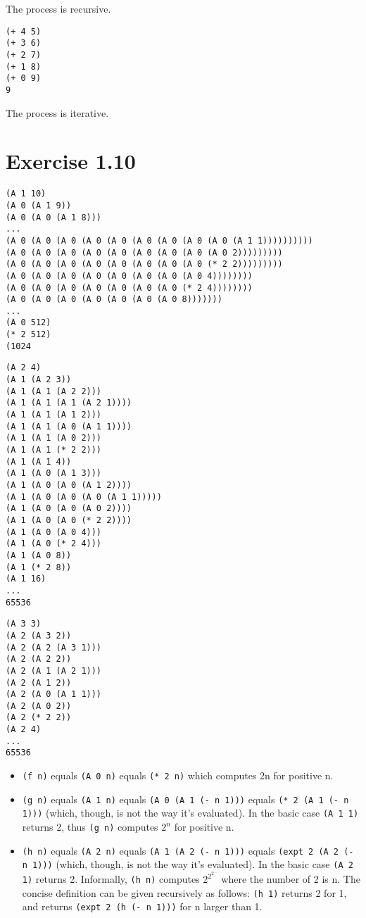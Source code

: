 \documentclass[../main.tex]{subfiles}
\begin{document}
The process is recursive.

\begin{lstlisting}
(+ 4 5)
(+ 3 6)
(+ 2 7)
(+ 1 8)
(+ 0 9)
9
\end{lstlisting}

The process is iterative.

\section{Exercise 1.10}

\begin{lstlisting}
(A 1 10)
(A 0 (A 1 9))
(A 0 (A 0 (A 1 8)))
...
(A 0 (A 0 (A 0 (A 0 (A 0 (A 0 (A 0 (A 0 (A 0 (A 1 1))))))))))
(A 0 (A 0 (A 0 (A 0 (A 0 (A 0 (A 0 (A 0 (A 0 2)))))))))
(A 0 (A 0 (A 0 (A 0 (A 0 (A 0 (A 0 (A 0 (* 2 2)))))))))
(A 0 (A 0 (A 0 (A 0 (A 0 (A 0 (A 0 (A 0 4))))))))
(A 0 (A 0 (A 0 (A 0 (A 0 (A 0 (A 0 (* 2 4))))))))
(A 0 (A 0 (A 0 (A 0 (A 0 (A 0 (A 0 8)))))))
...
(A 0 512)
(* 2 512)
(1024
\end{lstlisting}

\begin{lstlisting}
(A 2 4)
(A 1 (A 2 3))
(A 1 (A 1 (A 2 2)))
(A 1 (A 1 (A 1 (A 2 1))))
(A 1 (A 1 (A 1 2)))
(A 1 (A 1 (A 0 (A 1 1))))
(A 1 (A 1 (A 0 2)))
(A 1 (A 1 (* 2 2)))
(A 1 (A 1 4))
(A 1 (A 0 (A 1 3)))
(A 1 (A 0 (A 0 (A 1 2))))
(A 1 (A 0 (A 0 (A 0 (A 1 1)))))
(A 1 (A 0 (A 0 (A 0 2))))
(A 1 (A 0 (A 0 (* 2 2))))
(A 1 (A 0 (A 0 4)))
(A 1 (A 0 (* 2 4)))
(A 1 (A 0 8))
(A 1 (* 2 8))
(A 1 16)
...
65536
\end{lstlisting}

\begin{lstlisting}
(A 3 3)
(A 2 (A 3 2))
(A 2 (A 2 (A 3 1)))
(A 2 (A 2 2))
(A 2 (A 1 (A 2 1)))
(A 2 (A 1 2))
(A 2 (A 0 (A 1 1)))
(A 2 (A 0 2))
(A 2 (* 2 2))
(A 2 4)
...
65536
\end{lstlisting}

\begin{itemize}
\item \lstinline{(f n)} equals \lstinline{(A 0 n)} equals \lstinline{(* 2 n)} which computes 2n for positive n.
\item \lstinline{(g n)} equals \lstinline{(A 1 n)} equals \lstinline{(A 0 (A 1 (- n 1)))} equals \lstinline{(* 2 (A 1 (- n 1)))} (which, though, is not the way it's evaluated). In the basic case \lstinline{(A 1 1)} returns 2, thus \lstinline{(g n)} computes $2^n$ for positive n.
\item \lstinline{(h n)} equals \lstinline{(A 2 n)} equals \lstinline{(A 1 (A 2 (- n 1)))} equals \lstinline{(expt 2 (A 2 (- n 1)))} (which, though, is not the way it's evaluated). In the basic case \lstinline{(A 2 1)} returns 2. Informally, \lstinline{(h n)} computes $2^{2^{2^{...}}}$ where the number of 2 is n. The concise definition can be given recursively as follows: \lstinline{(h 1)} returns 2 for 1, and returns \lstinline{(expt 2 (h (- n 1)))} for n larger than 1.
\end{itemize}
\end{document}
